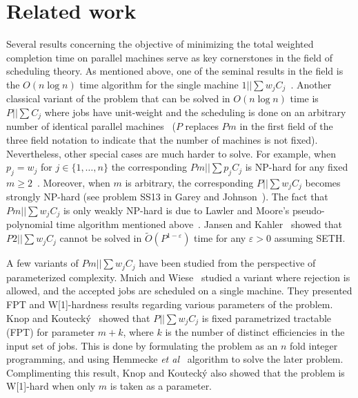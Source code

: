 \section{Related work}
Several results concerning the objective of minimizing the total weighted completion time on parallel machines serve as key cornerstones in the field of scheduling theory. As mentioned above, one of the seminal results in the field is the $O(n \log n)$ time algorithm for the single machine $1||\sum w_jC_j$~\cite{Smith1956}. Another classical variant of the problem that can be solved in $O(n \log n)$ time is $P|| \sum C_j$ where jobs have unit-weight and the scheduling is done on an arbitrary number of identical parallel machines~\cite{ConwayMM1967} ($P$ replaces $Pm$ in the first field of the three field notation to indicate that the number of machines is not fixed). Nevertheless, other special cases are much harder to solve. For example, when $p_j=w_j$ for $j\in\{1,\ldots,n\}$ the corresponding $Pm||\sum p_j C_j$ is NP-hard for any fixed $m \geq 2$~\cite{BrunoCoffman}. Moreover, when $m$ is arbitrary, the corresponding $P||\sum w_j C_j$ becomes strongly NP-hard (see problem SS13 in Garey and Johnson~\cite{GareyJohnson}). The fact that $Pm||\sum w_j C_j$ is only weakly NP-hard is due to Lawler and Moore's pseudo-polynomial time algorithm mentioned above~\cite{LawlerMoore}. Jansen and Kahler~\cite{Jansenee} showed that $P2||\sum w_j C_j$ cannot be solved in $\tilde{O}(P^{1-\varepsilon})$ time for any $\varepsilon > 0$ assuming SETH.%

A few variants of $Pm||\sum w_jC_j$ have been studied from the perspective of parameterized complexity. Mnich and Wiese~\cite{MnichW15} studied a variant where rejection is allowed, and the accepted jobs are scheduled on a single machine. They presented FPT and W[1]-hardness results regarding various parameters of the problem.
Knop and Kouteck{\'{y}}~\cite{DBLP:journals/scheduling/KnopK18} showed that $P||\sum w_j C_j$ is fixed parametrized tractable (FPT) for parameter $m+k$, where $k$ is the number of distinct efficiencies in the input set of jobs. This is done by formulating the problem as an $n$ fold integer programming, and using Hemmecke \emph{et al}~\cite{DBLP:journals/mp/HemmeckeOR13} algorithm to solve the later problem. Complimenting this result, Knop and Kouteck{\'{y}} also showed that the problem is W[1]-hard when only $m$ is taken as a parameter.%


